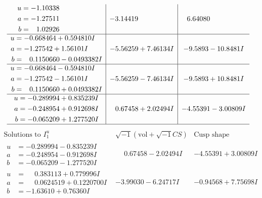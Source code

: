 \documentclass[1p]{elsarticle_modified}
\theoremstyle{definition}
\newcommand{\I}{\sqrt{-1}}
\begin{document}
$$\begin{array}{c|c|c}
\begin{aligned}
u &= -1.10338\phantom{ +0.000000I} \\
a &= -1.27511\phantom{ +0.000000I} \\
b &= \phantom{-}1.02926\phantom{ +0.000000I}\end{aligned}
 & -3.14419\phantom{ +0.000000I} & \phantom{-}6.64080\phantom{ +0.000000I} \\ \hline\begin{aligned}
u &= -0.668464 + 0.594810 I \\
a &= -1.27542 + 1.56101 I \\
b &= \phantom{-}0.1150660 - 0.0493382 I\end{aligned}
 & -5.56259 + 7.46134 I & -9.5893 - 10.8481 I \\ \hline\begin{aligned}
u &= -0.668464 - 0.594810 I \\
a &= -1.27542 - 1.56101 I \\
b &= \phantom{-}0.1150660 + 0.0493382 I\end{aligned}
 & -5.56259 - 7.46134 I & -9.5893 + 10.8481 I \\ \hline\begin{aligned}
u &= -0.289994 + 0.835239 I \\
a &= -0.248954 + 0.912698 I \\
b &= -0.065209 + 1.277520 I\end{aligned}
 & \phantom{-}0.67458 + 2.02494 I & -4.55391 - 3.00809 I\\
 \hline 
 \end{array}$$\newpage$$\begin{array}{c|c|c}  
\text{Solutions to }I^u_{1}& \I (\text{vol} + \sqrt{-1}CS) & \text{Cusp shape}\\
 \hline 
\begin{aligned}
u &= -0.289994 - 0.835239 I \\
a &= -0.248954 - 0.912698 I \\
b &= -0.065209 - 1.277520 I\end{aligned}
 & \phantom{-}0.67458 - 2.02494 I & -4.55391 + 3.00809 I \\ \hline\begin{aligned}
u &= \phantom{-}0.383113 + 0.779996 I \\
a &= \phantom{-}0.0624519 + 0.1220700 I \\
b &= -1.63610 + 0.76360 I\end{aligned}
 & -3.99030 - 6.24717 I & -0.94568 + 7.75698 I \\ \hline\begin{aligned}

\end{aligned}
\end{array}$$
\end{document}
